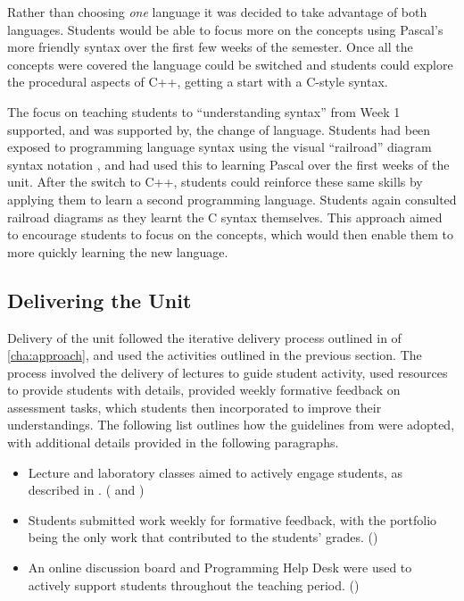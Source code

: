 Rather than choosing \emph{one} language it was decided to take advantage of both languages. Students would be able to focus more on the concepts using Pascal's more friendly syntax over the first few weeks of the semester. Once all the concepts were covered the language could be switched and students could explore the procedural aspects of C++, getting a start with a C-style syntax.

The focus on teaching students to ``understanding syntax'' from Week 1 supported, and was supported by, the change of language. Students had been exposed to programming language syntax using the visual ``railroad'' diagram syntax notation \cite{Braz:1990}, and had used this to learning Pascal over the first weeks of the unit. After the switch to C++, students could reinforce these same skills by applying them to learn a second programming language. Students again consulted railroad diagrams as they learnt the C syntax themselves. This approach aimed to encourage students to focus on the concepts, which would then enable them to more quickly learning the new language.




\subsection{Delivering the Unit} %
\label{sub:delivering_the_unit}

Delivery of the unit followed the iterative delivery process outlined in  of \cref{cha:approach}, and used the activities outlined in the previous section. The process involved the delivery of lectures to guide student activity, used resources to provide students with details, provided weekly formative feedback on assessment tasks, which students then incorporated to improve their understandings. The following list outlines how the guidelines from  were adopted, with additional details provided in the following paragraphs.

\begin{itemize}
	\item Lecture and laboratory classes aimed to actively engage students, as described in . ( and )
	\item Students submitted work weekly for formative feedback, with the portfolio being the only work that contributed to the students' grades. () 
	\item An online discussion board and Programming Help Desk were used to actively support students throughout the teaching period. ()
\end{itemize}

